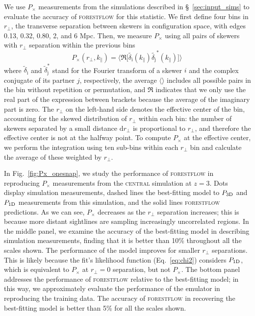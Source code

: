 \documentclass[longauth]{aa}
\newcommand{\pcross}{$P_{\times}$\xspace}
\newcommand{\poned}{\ensuremath{P_{\rm 1D}}\xspace}
\newcommand{\pthreed}{\ensuremath{P_{\rm 3D}}\xspace}
\newcommand{\forestflow}{\textsc{forestflow}\xspace}
\newcommand{\simcentral}{\textsc{central}\xspace}
\begin{document}
We use \pcross measurements from the simulations described in \S~\ref{sec:input_sims} to evaluate the accuracy of \forestflow for this statistic. We first define four bins in $r_\perp$, the transverse separation between skewers in configuration space, with edges 0.13, 0.32, 0.80, 2, and 6 Mpc. Then, we measure \pcross using all pairs of skewers with $r_\perp$ separation within the previous bins 
%
\begin{equation}
    P_\times(r_\perp, k_\parallel) = \bigg \langle \Re \Big[\tilde{\delta_\mathrm{i}}(k_\parallel) \tilde{\delta_\mathrm{j}}^*(k_\parallel)\Big]\bigg\rangle \,
\end{equation}
%
where $\tilde{\delta}_\mathrm{i}$ and $\tilde{\delta}^*_\mathrm{j}$ stand for the Fourier transform of a skewer $i$ and the complex conjugate of its partner $j$, respectively, the average $\langle\rangle$ includes all possible pairs in the bin without repetition or permutation, and $\Re$ indicates that we only use the real part of the expression between brackets because the average of the imaginary part is zero. The $r_\perp$ on the left-hand side denotes the effective center of the bin, accounting for the skewed distribution of $r_\perp$ within each bin: the number of skewers separated by a small distance $\mathrm{d}r_\perp$ is proportional to $r_\perp$, and therefore the effective center is not at the halfway point. To compute \pcross at the effective center, we perform the integration using ten sub-bins within each $r_\perp$ bin and calculate the average of these weighted by $r_\perp$.
    
In Fig.~\ref{fig:Px_onesnap}, we study the performance of \forestflow in reproducing \pcross measurements from the \simcentral simulation at $z=3$. Dots display simulation measurements, dashed lines the best-fitting model to \pthreed and \poned measurements from this simulation, and the solid lines \forestflow predictions. As we can see, \pcross decreases as the $r_\perp$ separation increases; this is because more distant sightlines are sampling increasingly uncorrelated regions. In the middle panel, we examine the accuracy of the best-fitting model in describing simulation measurements, finding that it is better than 10\% throughout all the scales shown. The performance of the model improves for smaller $r_\perp$ separations. This is likely because the fit's likelihood function (Eq.~\ref{eq:chi2}) considers \poned, which is equivalent to \pcross at $r_\perp=0$ separation, but not \pcross. The bottom panel addresses the performance of \forestflow relative to the best-fitting model; in this way, we approximately evaluate the performance of the emulator in reproducing the training data. The accuracy of \forestflow in recovering the best-fitting model is better than 5\% for all the scales shown.
\end{document}
